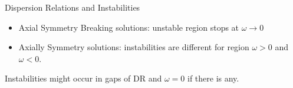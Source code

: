 \begin{frame}{Dispersion Relations and Instabilities}
\pause
\begin{tcolorbox}
   \begin{itemize}
      \item
      \color{black}Axial Symmetry Breaking solutions: unstable region stops at $\omega\to 0$
      \item
      \color{black} Axially Symmetry solutions: instabilities are different for region $\omega>0$ and $\omega<0$.
   \end{itemize}
\end{tcolorbox}
\pause
\begin{tcolorbox}
   \color{black} Instabilities might occur in gaps of DR and $\omega=0$ if there is any.
\end{tcolorbox}

\end{frame}










